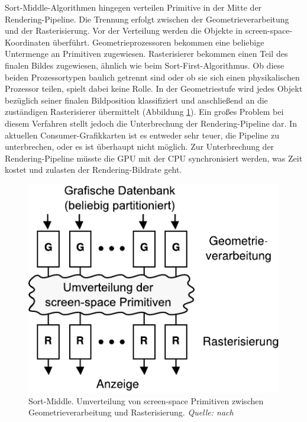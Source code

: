 Sort-Middle-Algorithmen hingegen verteilen Primitive in der Mitte der Ren\-de\-ring-Pipeline. Die Trennung erfolgt zwischen der Geometrieverarbeitung und der Rasterisierung. Vor der Verteilung werden die Objekte in screen-space-Koordinaten überführt. Geometrieprozessoren bekommen eine beliebige Untermenge an Primitiven zugewiesen. Rasterisierer bekommen einen Teil des finalen Bildes zugewiesen, ähnlich wie beim Sort-First-Algorithmus. Ob diese beiden Prozessortypen baulich getrennt sind oder ob sie sich einen physikalischen Prozessor teilen, spielt dabei keine Rolle. In der Geometriestufe wird jedes Objekt bezüglich seiner finalen Bildposition klassifiziert und anschließend an die zuständigen Rasterisierer übermittelt (Abbildung \ref{fig:relwork:sortmiddle}). Ein großes Problem bei diesem Verfahren stellt jedoch die Unterbrechung der Rendering-Pipeline dar. In aktuellen Consumer-Grafikkarten ist es entweder sehr teuer, die Pipeline zu unterbrechen, oder es ist überhaupt nicht möglich. Zur Unterbrechung der Rendering-Pipeline müsste die GPU mit der CPU synchronisiert werden, was Zeit kostet und zulasten der Rendering-Bildrate geht.
\begin{figure}
 \centering
  \includegraphics[scale=0.8]{images/sort-middle.pdf}
  \caption{Sort-Middle. Umverteilung von screen-space Primitiven zwischen Geometrieverarbeitung und Rasterisierung. \textit{Quelle: nach}}
 \label{fig:relwork:sortmiddle}
\end{figure}

